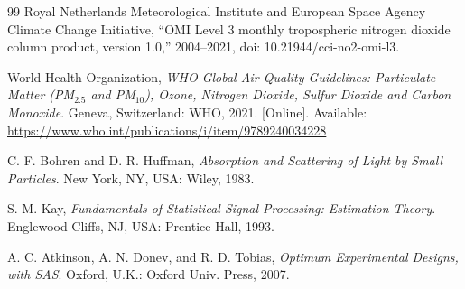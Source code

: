 \documentclass[conference]{IEEEtran}
\begin{document}
\begin{thebibliography}{99}
Royal Netherlands Meteorological Institute and European Space Agency Climate Change Initiative, ``OMI Level 3 monthly tropospheric nitrogen dioxide column product, version 1.0,'' 2004--2021, doi: 10.21944/cci-no2-omi-l3.

World Health Organization, \emph{WHO Global Air Quality Guidelines: Particulate Matter (PM$_{2.5}$ and PM$_{10}$), Ozone, Nitrogen Dioxide, Sulfur Dioxide and Carbon Monoxide}. Geneva, Switzerland: WHO, 2021. [Online]. Available: \url{https://www.who.int/publications/i/item/9789240034228}

C. F. Bohren and D. R. Huffman, \emph{Absorption and Scattering of Light by Small Particles}. New York, NY, USA: Wiley, 1983.

S. M. Kay, \emph{Fundamentals of Statistical Signal Processing: Estimation Theory}. Englewood Cliffs, NJ, USA: Prentice-Hall, 1993.

A. C. Atkinson, A. N. Donev, and R. D. Tobias, \emph{Optimum Experimental Designs, with SAS}. Oxford, U.K.: Oxford Univ. Press, 2007.

\end{thebibliography}
\end{document}
